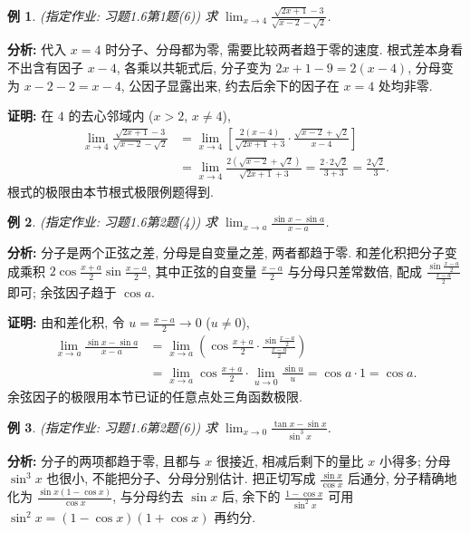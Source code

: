 \documentclass[UTF8,openany]{ctexbook}
\theoremstyle{chinesetextbook}
\newtheorem{example}{例}[section]
\newenvironment{cnproof}{\par\indent\textbf{证明:} \ignorespaces}{\par}
\begin{document}
\begin{example}
\textnormal{(指定作业: 习题1.6第1题(6))} 求 $\displaystyle \lim_{x\to4}\frac{\sqrt{2x+1}-3}{\sqrt{x-2}-\sqrt2}$.
\end{example}
\par\indent\textbf{分析:} 代入 $x=4$ 时分子、分母都为零, 需要比较两者趋于零的速度. 根式差本身看不出含有因子 $x-4$, 各乘以共轭式后, 分子变为 $2x+1-9=2(x-4)$, 分母变为 $x-2-2=x-4$, 公因子显露出来, 约去后余下的因子在 $x=4$ 处均非零.
\begin{cnproof}
在 $4$ 的去心邻域内 ($x>2$, $x\ne4$),
\[
\begin{aligned}
\lim_{x\to4}\frac{\sqrt{2x+1}-3}{\sqrt{x-2}-\sqrt2}
&=\lim_{x\to4}\left[\frac{2(x-4)}{\sqrt{2x+1}+3}\cdot\frac{\sqrt{x-2}+\sqrt2}{x-4}\right]\\
&=\lim_{x\to4}\frac{2\left(\sqrt{x-2}+\sqrt2\right)}{\sqrt{2x+1}+3}
=\frac{2\cdot2\sqrt2}{3+3}=\frac{2\sqrt2}3.
\end{aligned}
\]
根式的极限由本节根式极限例题得到.
\end{cnproof}
\begin{example}
\textnormal{(指定作业: 习题1.6第2题(4))} 求 $\displaystyle \lim_{x\to a}\frac{\sin x-\sin a}{x-a}$.
\end{example}
\par\indent\textbf{分析:} 分子是两个正弦之差, 分母是自变量之差, 两者都趋于零. 和差化积把分子变成乘积 $\displaystyle2\cos\frac{x+a}2\sin\frac{x-a}2$, 其中正弦的自变量 $\displaystyle\frac{x-a}2$ 与分母只差常数倍, 配成 $\displaystyle\frac{\sin\frac{x-a}2}{\frac{x-a}2}$ 即可; 余弦因子趋于 $\cos a$.
\begin{cnproof}
由和差化积, 令 $\displaystyle u=\frac{x-a}2\to0$ ($u\ne0$),
\[
\begin{aligned}
\lim_{x\to a}\frac{\sin x-\sin a}{x-a}
&=\lim_{x\to a}\left(\cos\frac{x+a}2\cdot\frac{\sin\frac{x-a}2}{\frac{x-a}2}\right)\\
&=\lim_{x\to a}\cos\frac{x+a}2\cdot\lim_{u\to0}\frac{\sin u}u=\cos a\cdot1=\cos a.
\end{aligned}
\]
余弦因子的极限用本节已证的任意点处三角函数极限.
\end{cnproof}
\begin{example}
\textnormal{(指定作业: 习题1.6第2题(6))} 求 $\displaystyle \lim_{x\to0}\frac{\tan x-\sin x}{\sin^3x}$.
\end{example}
\par\indent\textbf{分析:} 分子的两项都趋于零, 且都与 $x$ 很接近, 相减后剩下的量比 $x$ 小得多; 分母 $\sin^3x$ 也很小, 不能把分子、分母分别估计. 把正切写成 $\displaystyle\frac{\sin x}{\cos x}$ 后通分, 分子精确地化为 $\displaystyle\frac{\sin x(1-\cos x)}{\cos x}$, 与分母约去 $\sin x$ 后, 余下的 $\displaystyle\frac{1-\cos x}{\sin^2x}$ 可用 $\sin^2x=(1-\cos x)(1+\cos x)$ 再约分.
\end{document}
